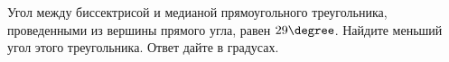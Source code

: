 \begin{ex}
	\begin{condition}
		Угол между биссектрисой и медианой прямоугольного треугольника, проведенными из вершины прямого угла, равен \( 29\degree \). Найдите меньший угол этого треугольника. Ответ дайте в градусах.
	\end{condition}
\end{ex}